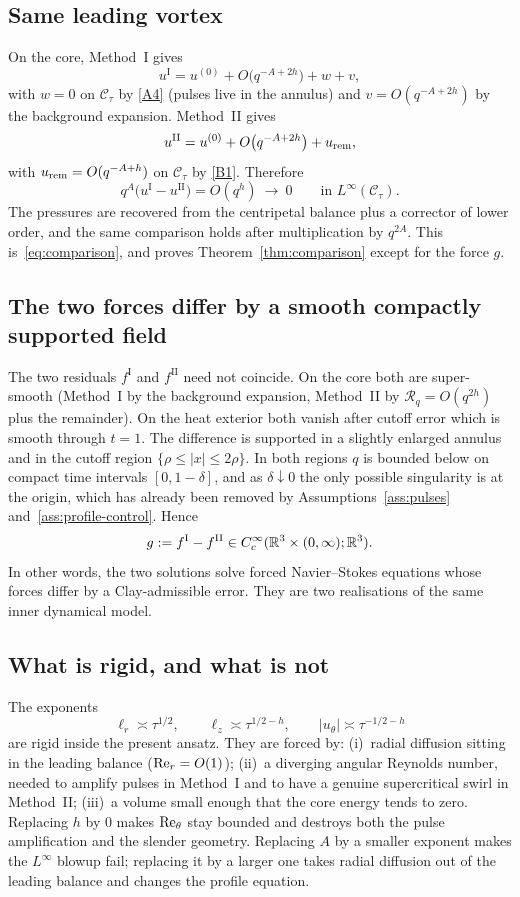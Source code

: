 \subsection{Same leading vortex}

On the core, Method~I gives
\[
u^{\mathrm I}=u^{(0)}+O\bigl(q^{-A+2h}\bigr)+w+v,
\]
with $w=0$ on $\mathcal C_\tau$ by \ref{A4} (pulses live in the annulus) and $v=O(q^{-A+2h})$ by the background expansion. Method~II gives
\[
u^{\mathrm{II}}=u^{(0)}+O\bigl(q^{-A+2h}\bigr)+u_{\mathrm{rem}},
\]
with $u_{\mathrm{rem}}=O(q^{-A+h})$ on $\mathcal C_\tau$ by \ref{B1}. Therefore
\[
q^{A}\bigl(u^{\mathrm I}-u^{\mathrm{II}}\bigr)
=O(q^{h})\ \longrightarrow\ 0
\qquad\text{in }L^\infty(\mathcal C_\tau).
\]
The pressures are recovered from the centripetal balance plus a corrector of lower order, and the same comparison holds after multiplication by $q^{2A}$. This is~\eqref{eq:comparison}, and proves Theorem~\ref{thm:comparison} except for the force $g$.

\subsection{The two forces differ by a smooth compactly supported field}

The two residuals $f^{\mathrm I}$ and $f^{\mathrm{II}}$ need not coincide. On the core both are super-smooth (Method~I by the background expansion, Method~II by $\mathcal R_q=O(q^{2h})$ plus the remainder). On the heat exterior both vanish after cutoff error which is smooth through $t=1$. The difference is supported in a slightly enlarged annulus and in the cutoff region $\{ \rho\le |x|\le 2\rho\}$. In both regions $q$ is bounded below on compact time intervals $[0,1-\delta]$, and as $\delta\downarrow 0$ the only possible singularity is at the origin, which has already been removed by Assumptions~\ref{ass:pulses} and~\ref{ass:profile-control}. Hence
\[
g:=f^{\mathrm I}-f^{\mathrm{II}}
\in C_c^\infty(\mathbb{R}^3\times(0,\infty);\mathbb{R}^3).
\]
In other words, the two solutions solve forced {N}avier--{S}tokes equations whose forces differ by a {C}lay-admissible error. They are two realisations of the same inner dynamical model.

\subsection{What is rigid, and what is not}

The exponents
\[
\ell_r\asymp\tau^{1/2},\qquad
\ell_z\asymp\tau^{1/2-h},\qquad
|u_\theta|\asymp\tau^{-1/2-h}
\]
are rigid inside the present ansatz. They are forced by: (i)~radial diffusion sitting in the leading balance ($\mathrm{Re}_r=O(1)$); (ii)~a diverging angular {R}eynolds number, needed to amplify pulses in Method~I and to have a genuine supercritical swirl in Method~II; (iii)~a volume small enough that the core energy tends to zero. Replacing $h$ by $0$ makes $\mathrm{Re}_\theta$ stay bounded and destroys both the pulse amplification and the slender geometry. Replacing $A$ by a smaller exponent makes the $L^\infty$ blowup fail; replacing it by a larger one takes radial diffusion out of the leading balance and changes the profile equation.

